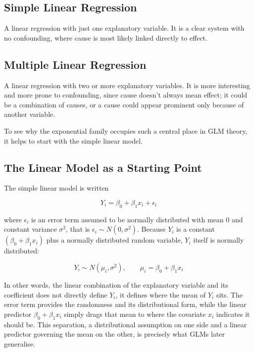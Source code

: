 \subsection*{Simple Linear Regression}
A linear regression with just one explanatory variable. It is a clear system with no confounding, where cause is most likely linked directly to effect.

\subsection*{Multiple Linear Regression}
A linear regression with two or more explanatory variables. It is more interesting and more prone to confounding, since cause doesn't always mean effect; it could be a combination of causes, or a cause could appear prominent only because of another variable.

To see why the exponential family occupies such a central place in GLM theory, it helps to start with the simple linear model.

\subsection*{The Linear Model as a Starting Point}
The simple linear model is written
\begin{mathbox}
\[
Y_i = \beta_0 + \beta_1 x_i + \epsilon_i
\]
\end{mathbox}
where $\epsilon_i$ is an error term assumed to be normally distributed with mean 0 and constant variance $\sigma^2$, that is $\epsilon_i \sim N(0,\sigma^2)$. Because $Y_i$ is a constant $(\beta_0+\beta_1 x_i)$ plus a normally distributed random variable, $Y_i$ itself is normally distributed:
\begin{mathbox}
\[
Y_i \sim N(\mu_i,\sigma^2), \qquad \mu_i = \beta_0 + \beta_1 x_i
\]
\end{mathbox}

In other words, the linear combination of the explanatory variable and its coefficient does not directly define $Y_i$, it defines where the mean of $Y_i$ sits. The error term provides the randomness and its distributional form, while the linear predictor $\beta_0+\beta_1 x_i$ simply drags that mean to where the covariate $x_i$ indicates it should be. This separation, a distributional assumption on one side and a linear predictor governing the mean on the other, is precisely what GLMs later generalise.

